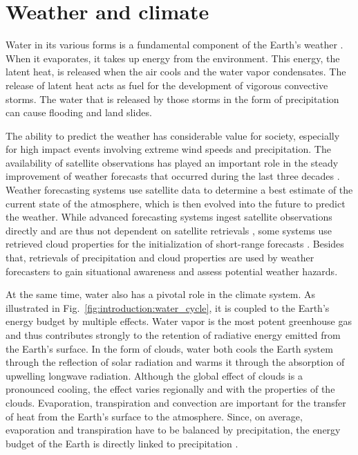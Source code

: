 \section{Weather and climate}

Water in its various forms is a fundamental component of the Earth's weather
\citep{stevens13}.
When it evaporates, it takes up energy from the environment. This energy, the
latent heat, is released when the air cools and the water vapor condensates. The
release of latent heat acts as fuel for the development of vigorous convective
storms. The water that is released by those storms in the form of precipitation
can cause flooding and land slides.

The ability to predict the weather has considerable value for society,
especially for high impact events involving extreme wind speeds and
precipitation. The availability of satellite observations has played an
important role in the steady improvement of weather forecasts that occurred
during the last three decades
\citep{bauer15}. Weather forecasting  systems use satellite data to
determine a best estimate of the current state of the atmosphere, which is then
evolved into the future to predict the weather. While advanced forecasting
systems ingest satellite observations directly and are thus not dependent on
satellite retrievals \citep{bauer10}, some systems use retrieved cloud
properties for the initialization of short-range forecasts
\citep{dehaan14, benjamin21}. Besides that, retrievals of precipitation and
cloud properties are used by weather forecasters to gain situational awareness
and assess potential weather hazards.


At the same time, water also has a pivotal role in the climate system. As
illustrated in Fig.~\ref{fig:introduction:water_cycle}, it is coupled to the
Earth's energy budget by multiple effects. Water vapor is the most potent
greenhouse gas and thus contributes strongly to the retention of radiative
energy emitted from the Earth's surface. In the form of clouds, water both cools
the Earth system through the reflection of solar radiation and warms it through
the absorption of upwelling longwave radiation. Although the global effect of
clouds is a pronounced cooling, the effect varies regionally and with the
properties of the clouds. Evaporation, transpiration and convection are
important for the transfer of heat from the Earth's surface to the atmosphere.
Since, on average, evaporation and transpiration have to be balanced by
precipitation, the energy budget of the Earth is directly linked to
precipitation \citep{trenberth09}.


